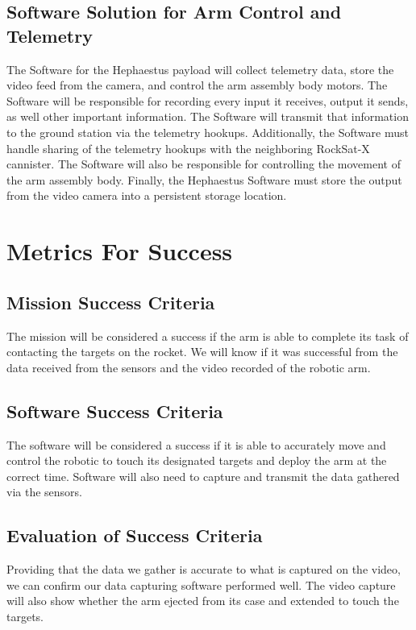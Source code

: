 \documentclass[letterpaper,10pt]{article}
\begin{document}
\subsection{Software Solution for Arm Control and Telemetry}
The Software for the Hephaestus payload will collect telemetry data, store the video feed from the
camera, and control the arm assembly body motors.
The Software will be responsible for recording every input it receives, output it sends, as well other
important information. The Software will transmit that information to the ground station via the
telemetry hookups.
Additionally, the Software must handle sharing of the telemetry hookups with the neighboring RockSat-X
cannister. 
The Software will also be responsible for controlling the movement of the arm assembly body. 
Finally, the Hephaestus Software must store the output from the video camera into a persistent storage
location.

\section{Metrics For Success}
\subsection{Mission Success Criteria}
The mission will be considered a success if the arm is able to complete its task of contacting the targets on the rocket. We will know if it was
successful from the data received from the sensors and the video recorded of the robotic arm.
\subsection{Software Success Criteria}
The software will be considered a success if it is able to accurately move and control the robotic to touch its designated targets and deploy
the arm at the correct time. Software will also need to capture and transmit the data gathered via the sensors.  
\subsection{Evaluation of Success Criteria}
Providing that the data we gather is accurate to what is captured on the video, we can confirm our data capturing software performed well.
The video capture will also show whether the arm ejected from its case and extended to touch the targets.
\end{document}
